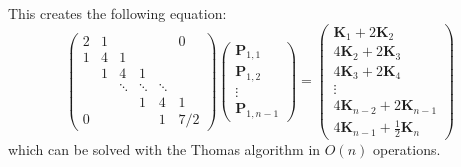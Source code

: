 \documentclass[10pt]{article}
\begin{document}
	This creates the following equation:
	$$
	\begin{pmatrix}
		2 & 1 &   &   &   & 0 \\
		1 & 4 & 1 \\
		\ & 1 & 4 & 1 \\
		\ & \ & \ddots & \ddots & \ddots \\
		\ & \ & \ & 1 & 4 & 1 \\
		0 & \ & \ & \ & 1 & 7/2
	\end{pmatrix}
	\begin{pmatrix}
		\textbf{P}_{1,1} \\
		\textbf{P}_{1,2} \\
		\vdots \\
		\textbf{P}_{1,n-1}
	\end{pmatrix}
	=
	\begin{pmatrix}
		\textbf{K}_{1} + 2\textbf{K}_{2} \\
		4\textbf{K}_{2} + 2\textbf{K}_{3} \\
		4\textbf{K}_{3} + 2\textbf{K}_{4} \\
		\vdots \\
		4\textbf{K}_{n-2} + 2\textbf{K}_{n-1} \\
		4\textbf{K}_{n-1} + \frac{1}{2}\textbf{K}_{n}
	\end{pmatrix}
	$$
	which can be solved with the Thomas algorithm in $O(n)$ operations.
\end{document}
